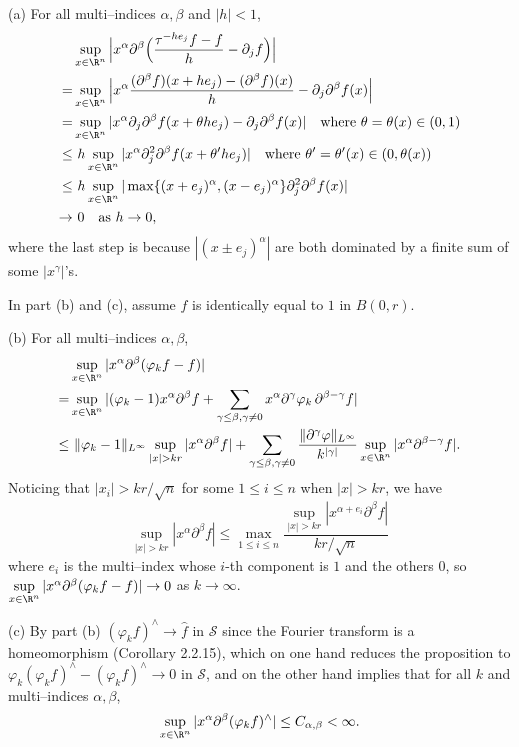 \begin{itemize}
(a) For all multi--indices $\alpha,\beta$ and $|h|<1$,
\begin{align*}
&\sup_{x\in\R^n} \Big|x^\alpha \partial^\beta\Big(\frac{\tau^{-he_j}f-f}{h}-\partial_j f\Big)\Big|\\
=&\sup_{x\in\R^n} \Big|x^\alpha \frac{(\partial^\beta f)(x+he_j)-(\partial^\beta f)(x)}{h}-\partial_j \partial^\beta f(x)\Big|\\
=&\sup_{x\in\R^n} |x^\alpha \partial_j \partial^\beta f(x+\theta he_j)-\partial_j \partial^\beta f(x)| \quad \textup{where}\ \theta=\theta(x)\in(0,1)\\
\leq&\ h\sup_{x\in\R^n} |x^\alpha \partial_j^2\partial^\beta f(x+\theta'he_j)| \quad \textup{where}\ \theta'=\theta'(x)\in(0,\theta(x))\\
\leq&\ h\sup_{x\in\R^n} |\max\{(x+e_j)^\alpha,(x-e_j)^\alpha\} \partial_j^2\partial^\beta f(x)|\\
\rightarrow&\ 0 \quad \text{as } h\rightarrow0,
\end{align*}
where the last step is because $|(x\pm e_j)^\alpha|$ are 
both dominated by a finite sum of some $|x^\gamma|$'s.

In part (b) and (c), assume $f$ is identically equal to $1$ in $B(0,r)$.

(b) 
For all multi--indices $\alpha,\beta$,
\begin{align*}
&\sup_{x\in\R^n} |x^\alpha \partial^\beta(\varphi_k f-f)|\\
=&\sup_{x\in\R^n} |(\varphi_k-1)x^\alpha \partial^\beta f+\sum_{\gamma\leq\beta,\gamma\neq0}x^\alpha\partial^\gamma\varphi_k\,\partial^{\beta-\gamma}f|\\
\leq&\ \|\varphi_k-1\|_{L^\infty}\sup_{|x|>kr}|x^\alpha\partial^\beta f|
+\sum_{\gamma\leq\beta,\gamma\neq0}\frac{\|\partial^\gamma\varphi\|_{L^\infty}}{k^{|\gamma|}}\sup_{x\in\R^n} |x^\alpha \partial^{\beta-\gamma}f|.
\end{align*}
Noticing that $|x_i|>kr/\sqrt{n}$ for some $1\leq i\leq n$ when $|x|>kr$, 
we have $$\sup_{|x|>kr}|x^\alpha\partial^\beta f|
\leq\max\limits_{1\leq i\leq n}\frac{\sup\limits_{|x|>kr}|x^{\alpha+e_i}\partial^\beta f|}{kr/\sqrt{n}}$$
where $e_i$ is the multi--index whose $i$-th component is $1$ and the others $0$, 
so $\sup\limits_{x\in\R^n} |x^\alpha \partial^\beta(\varphi_k f-f)|\rightarrow0$ as $k\rightarrow\infty$.

(c) By part (b) $(\varphi_k f)^\wedge\rightarrow \hat{f}$ in $\mathscr{S}$ 
since the Fourier transform is a homeomorphism (Corollary 2.2.15), 
which on one hand reduces the proposition to 
$\varphi_k(\varphi_k f)^\wedge-(\varphi_k f)^\wedge\rightarrow0$ in $\mathscr{S}$, 
and on the other hand implies that for all $k$ and multi--indices $\alpha,\beta$,
$$\sup_{x\in\R^n} |x^\alpha\partial^\beta (\varphi_k f)^\wedge|\leq C_{\alpha,\beta}<\infty.$$


\end{itemize}
